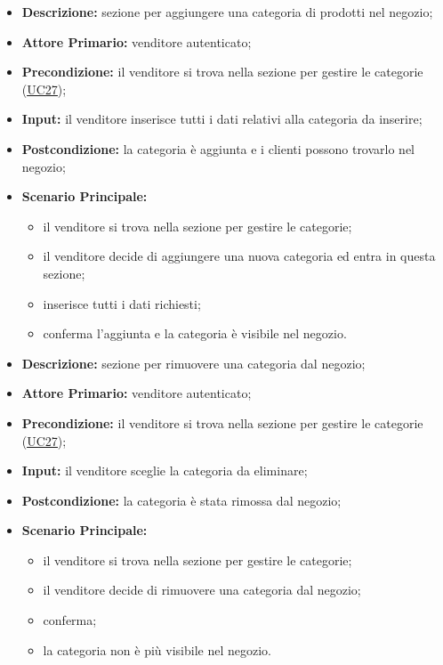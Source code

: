 \label{sec:UC27.1}
\begin{itemize}
    \item \textbf{Descrizione:} sezione per aggiungere una categoria di prodotti nel negozio;
    \item \textbf{Attore Primario:} venditore autenticato;
    \item \textbf{Precondizione:} il venditore si trova nella sezione per gestire le categorie (\hyperref[sec:UC27]{\underline{UC27}});
    \item \textbf{Input:} il venditore inserisce tutti i dati relativi alla categoria da inserire;
    \item \textbf{Postcondizione:} la categoria è aggiunta e i clienti possono trovarlo nel negozio;
    \item \textbf{Scenario Principale:}
          \begin{itemize}
              \item il venditore si trova nella sezione per gestire le categorie;
              \item il venditore decide di aggiungere una nuova categoria ed entra in questa sezione;
              \item inserisce tutti i dati richiesti;
              \item conferma l'aggiunta e la categoria è visibile nel negozio.
          \end{itemize}
\end{itemize}
\label{sec:UC27.2}
\begin{itemize}
    \item \textbf{Descrizione:} sezione per rimuovere una categoria dal negozio;
    \item \textbf{Attore Primario:} venditore autenticato;
    \item \textbf{Precondizione:} il venditore si trova nella sezione per gestire le categorie (\hyperref[sec:UC27]{\underline{UC27}});
    \item \textbf{Input:} il venditore sceglie la categoria da eliminare;
    \item \textbf{Postcondizione:} la categoria è stata rimossa dal negozio;
    \item \textbf{Scenario Principale:}
          \begin{itemize}
              \item il venditore si trova nella sezione per gestire le categorie;
              \item il venditore decide di rimuovere una categoria dal negozio;
              \item conferma;
              \item la categoria non è più visibile nel negozio.
          \end{itemize}
\end{itemize}

